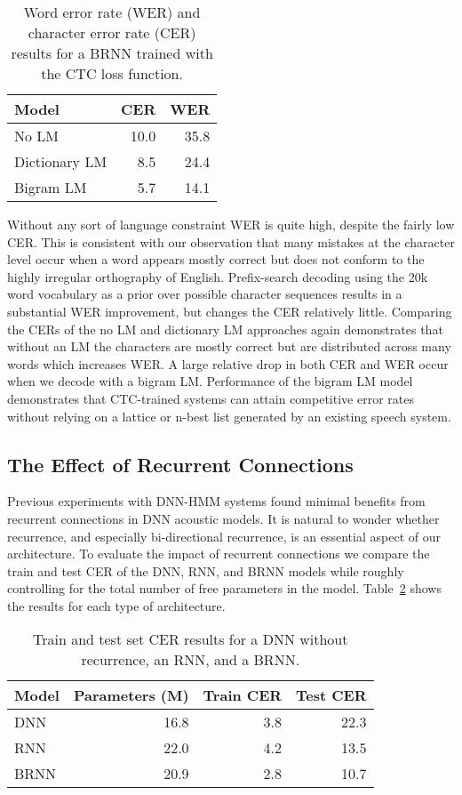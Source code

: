 \begin{table}
\centering
\begin{tabular}{lrr}
\toprule
Model & CER & WER\\
\midrule
No LM         & 10.0 & 35.8 \\
Dictionary LM & 8.5  & 24.4 \\
Bigram LM     & 5.7  & 14.1 \\
\bottomrule
\end{tabular}
\caption{Word error rate (WER) and character error rate (CER) results
  for a BRNN trained with the CTC loss function.}
\label{tab:first_pass:res_decode}
\end{table}

Without any sort of language constraint WER is quite high, despite the fairly
low CER. This is consistent with our observation that many mistakes at the
character level occur when a word appears mostly correct but does not conform
to the highly irregular orthography of English. Prefix-search decoding using
the 20k word vocabulary as a prior over possible character sequences results in
a substantial WER improvement, but changes the CER relatively little. Comparing
the CERs of the no LM and dictionary LM approaches again demonstrates that
without an LM the characters are mostly correct but are distributed across many
words which increases WER. A large relative drop in both CER and WER occur when
we decode with a bigram LM. Performance of the bigram LM model demonstrates
that CTC-trained systems can attain competitive error rates without relying on
a lattice or n-best list generated by an existing speech system.

\subsection{The Effect of Recurrent Connections}

Previous experiments with DNN-HMM systems found minimal benefits from recurrent
connections in DNN acoustic models. It is natural to wonder whether recurrence,
and especially bi-directional recurrence, is an essential aspect of our
architecture. To evaluate the impact of recurrent connections we compare the
train and test CER of the DNN, RNN, and BRNN models while roughly controlling
for the total number of free parameters in the model.
Table~\ref{tab:first_pass:res_recurrence} shows the results for each type of
architecture. 

\begin{table}
\centering
\begin{tabular}{lrrr}
\toprule
Model & Parameters (M) & Train CER & Test CER \\
\midrule
DNN  & 16.8 & 3.8 & 22.3 \\
RNN  & 22.0 & 4.2 & 13.5 \\
BRNN & 20.9 & 2.8 & 10.7 \\
\bottomrule
\end{tabular}
\caption{Train and test set CER results for a DNN without recurrence, an RNN,
         and a BRNN.}
\label{tab:first_pass:res_recurrence}
\end{table}

